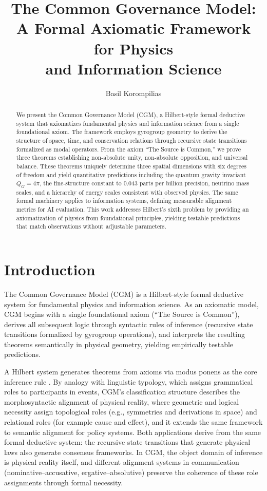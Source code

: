 \documentclass[11pt,a4paper]{article}
\title{The Common Governance Model: \\
A Formal Axiomatic Framework for Physics \\ and Information Science}
\author{Basil Korompilias}
\date{}
\theoremstyle{definition}
\theoremstyle{remark}
\begin{document}
\maketitle

\begin{abstract}
We present the Common Governance Model (CGM), a Hilbert-style formal deductive system that axiomatizes fundamental physics and information science from a single foundational axiom. The framework employs gyrogroup geometry to derive the structure of space, time, and conservation relations through recursive state transitions formalized as modal operators. From the axiom ``The Source is Common,'' we prove three theorems establishing non-absolute unity, non-absolute opposition, and universal balance. These theorems uniquely determine three spatial dimensions with six degrees of freedom and yield quantitative predictions including the quantum gravity invariant $Q_G = 4\pi$, the fine-structure constant to 0.043 parts per billion precision, neutrino mass scales, and a hierarchy of energy scales consistent with observed physics. The same formal machinery applies to information systems, defining measurable alignment metrics for AI evaluation. This work addresses Hilbert's sixth problem by providing an axiomatization of physics from foundational principles, yielding testable predictions that match observations without adjustable parameters.
\end{abstract}

\section{Introduction}

The Common Governance Model (CGM) is a Hilbert-style formal deductive system \cite{Mendelson2009} for fundamental physics and information science. As an axiomatic model, CGM begins with a single foundational axiom (``The Source is Common''), derives all subsequent logic through syntactic rules of inference (recursive state transitions formalized by gyrogroup operations), and interprets the resulting theorems semantically in physical geometry, yielding empirically testable predictions.

A Hilbert system generates theorems from axioms via modus ponens as the core inference rule \cite{Mendelson2009}. By analogy with linguistic typology, which assigns grammatical roles to participants in events, CGM's classification structure describes the morphosyntactic alignment of physical reality, where geometric and logical necessity assign topological roles (e.g., symmetries and derivations in space) and relational roles (for example cause and effect), and it extends the same framework to semantic alignment for policy systems. Both applications derive from the same formal deductive system: the recursive state transitions that generate physical laws also generate consensus frameworks. In CGM, the object domain of inference is physical reality itself, and different alignment systems in communication (nominative--accusative, ergative--absolutive) preserve the coherence of these role assignments through formal necessity.
\end{document}
